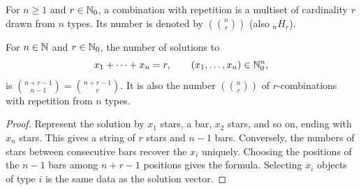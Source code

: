 \documentclass[11pt, oneside]{article}
\begin{document}
\begin{definition}
For $n\ge1$ and $r\in\mathbb{N}_0$, a combination with repetition is a multiset of cardinality $r$ drawn from $n$ types. Its number is denoted by $\left(\!\binom nr\!\right)$ (also ${}_nH_r$).
\end{definition}

\begin{theorem}\label{thm:starsbars}
For $n\in\mathbb{N}$ and $r\in\mathbb{N}_0$, the number of solutions to
\[
x_1+\cdots+x_n=r, \qquad (x_1, \ldots, x_n)\in\mathbb{N}_0^n,
\]
is $\binom{n+r-1}{n-1}=\binom{n+r-1}{r}$. It is also the number $\left(\!\binom nr\!\right)$ of $r$-combinations with repetition from $n$ types.
\end{theorem}
\begin{proof}
Represent the solution by $x_1$ stars, a bar, $x_2$ stars, and so on, ending with $x_n$ stars. This gives a string of $r$ stars and $n-1$ bars. Conversely, the numbers of stars between consecutive bars recover the $x_i$ uniquely. Choosing the positions of the $n-1$ bars among $n+r-1$ positions gives the formula. Selecting $x_i$ objects of type $i$ is the same data as the solution vector.
\end{proof}
\end{document}
